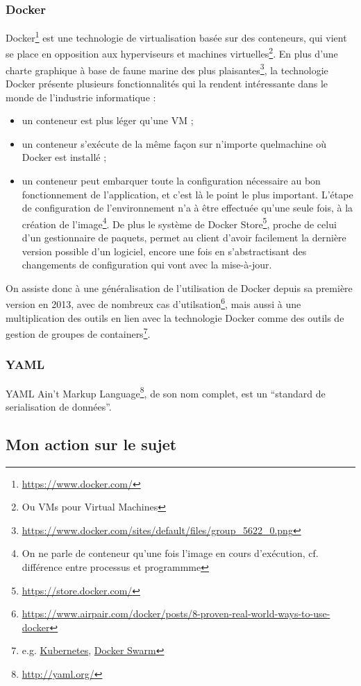 \subsubsection{Docker}
Docker\footnote{\url{https://www.docker.com/}} est une technologie de virtualisation basée sur des conteneurs, qui vient se place en opposition aux hyperviseurs et machines virtuelles\footnote{Ou VMs pour Virtual Machines}. En plus d'une charte graphique à base de faune marine des plus plaisantes\footnote{\url{https://www.docker.com/sites/default/files/group_5622_0.png}}, la technologie Docker présente plusieurs fonctionnalités qui la rendent intéressante dans le monde de l'industrie informatique :
\begin{itemize}[label=$\bullet$]
\item un conteneur est plus léger qu'une VM ;
\item un conteneur s'exécute de la même façon sur n'importe quelmachine où Docker est installé ;
\item un conteneur peut embarquer toute la configuration nécessaire au bon fonctionnement de l'application, et c'est là le point le plus important. L'étape de configuration de l'environnement n'a à être effectuée qu'une seule fois, à la création de l'image\footnote{On ne parle de conteneur qu'une fois l'image en cours d'exécution, cf. différence entre processus et programmme}. De plus le système de Docker Store\footnote{\url{https://store.docker.com/}}, proche de celui d'un gestionnaire de paquets, permet au client d'avoir facilement la dernière version possible d'un logiciel, encore une fois en s'abstractisant des changements de configuration qui vont avec la mise-à-jour.
\end{itemize}

On assiste donc à une généralisation de l'utilisation de Docker depuis sa première version en 2013, avec de nombreux cas d'utilsation\footnote{\url{https://www.airpair.com/docker/posts/8-proven-real-world-ways-to-use-docker}}, mais aussi à une multiplication des outils en lien avec la technologie Docker comme des outils de gestion de groupes de containers\footnote{e.g. \href{https://kubernetes.io/}{Kubernetes}, \href{https://docs.docker.com/engine/swarm/}{Docker Swarm}}.

\subsubsection{YAML}
YAML Ain't Markup Language\footnote{\url{http://yaml.org/}}, de son nom complet, est un ``standard de serialisation de données''.

\subsection{Mon action sur le sujet}